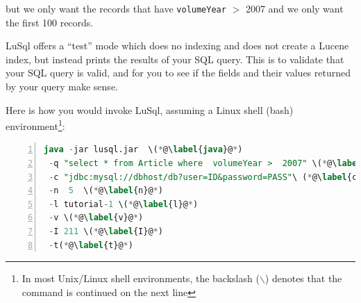 \noindent but we only want the records that have {\tt volumeYear} $>$  2007 and we
only want the first 100 records.

LuSql offers a ``test'' mode which does no indexing and does not create a Lucene
index, but instead prints the results of your SQL query.
This is to validate that your SQL query is valid, and for you to see if the
fields and their values returned by your query make sense.


Here is how you would invoke LuSql, assuming a Linux shell (bash)
 environment\footnote{In most Unix/Linux shell environments, the
 backslash ($\backslash$) denotes that the command is continued on the
 next line}:

{\small
\begin{lstlisting}[backgroundcolor=\color{grey},language=SQL,numbers=left]
java -jar lusql.jar  \(*@\label{java}@*)
 -q "select * from Article where  volumeYear >  2007" \(*@\label{q}@*)
 -c "jdbc:mysql://dbhost/db?user=ID&password=PASS"\ (*@\label{c}@*)
 -n  5  \(*@\label{n}@*)
 -l tutorial-1 \(*@\label{l}@*)
 -v \(*@\label{v}@*)
 -I 211 \(*@\label{I}@*)
 -t(*@\label{t}@*)
\end{lstlisting}
}



